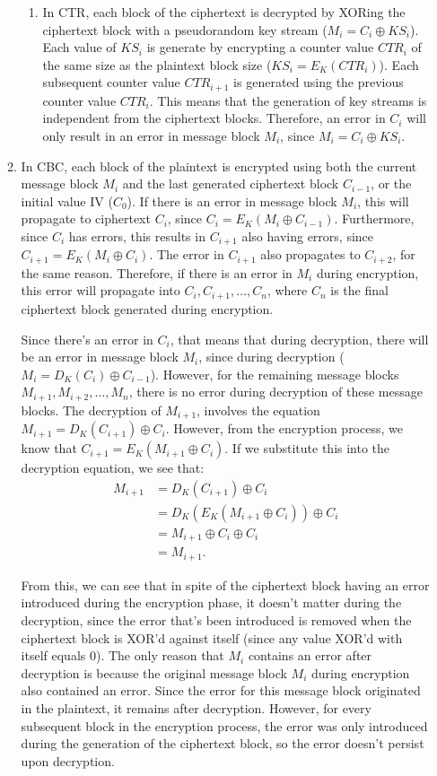 \documentclass[11pt]{article}
\theoremstyle{definition}
\begin{document}
\begin{enumerate}
\begin{enumerate}
\begin{enumerate}
\item In CTR, each block of the ciphertext is decrypted by XORing the ciphertext block with a pseudorandom key stream ($M_i = C_i \oplus KS_i$). Each value of $KS_i$ is generate by encrypting a counter value $CTR_i$ of the same size as the plaintext block size ($KS_i = E_K(CTR_i)$). Each subsequent counter value $CTR_{i+1}$ is generated using the previous counter value $CTR_i$. This means that the generation of key streams is independent from the ciphertext blocks. Therefore, an error in $C_i$ will only result in an error in message block $M_i$, since $M_i = C_i \oplus KS_i$.
\\
\end{enumerate}

\item In CBC, each block of the plaintext is encrypted using both the current message block $M_i$ and the last generated ciphertext block $C_{i-1}$, or the initial value IV ($C_0$). If there is an error in message block $M_i$, this will propagate to ciphertext $C_i$, since $C_i = E_K(M_i \oplus C_{i-1})$. Furthermore, since $C_i$ has errors, this results in $C_{i+1}$ also having errors, since $C_{i+1} = E_K(M_i \oplus C_i)$. The error in $C_{i+1}$ also propagates to $C_{i+2}$, for the same reason. Therefore, if there is an error in $M_i$ during encryption, this error will propagate into $C_i, C_{i+1}, \ldots, C_n$, where $C_n$ is the final ciphertext block generated during encryption.

Since there's an error in $C_i$, that means that during decryption, there will be an error in message block $M_i$, since during decryption ($M_i = D_K(C_i) \oplus C_{i-1}$). However, for the remaining message blocks $M_{i+1}, M_{i+2}, \ldots, M_n$, there is no error during decryption of these message blocks. The decryption of $M_{i+1}$, involves the equation $M_{i+1} = D_K(C_{i+1}) \oplus C_i$. However, from the encryption process, we know that $C_{i+1} = E_K(M_{i+1} \oplus C_i)$. If we substitute this into the decryption equation, we see that: 
\begin{align*}
    M_{i+1} &= D_K(C_{i+1}) \oplus C_i \\
    &= D_K(E_K(M_{i+1} \oplus C_i)) \oplus C_i \\
    &= M_{i+1} \oplus C_i \oplus C_i \\
    &= M_{i+1}.
\end{align*}

From this, we can see that in spite of the ciphertext block having an error introduced during the encryption phase, it doesn't matter during the decryption, since the error that's been introduced is removed when the ciphertext block is XOR'd against itself (since any value XOR'd with itself equals 0). The only reason that $M_i$ contains an error after decryption is because the original message block $M_i$ during encryption also contained an error. Since the error for this message block originated in the plaintext, it remains after decryption. However, for every subsequent block in the encryption process, the error was only introduced during the generation of the ciphertext block, so the error doesn't persist upon decryption.


\end{enumerate}
\end{enumerate}
\end{document}
